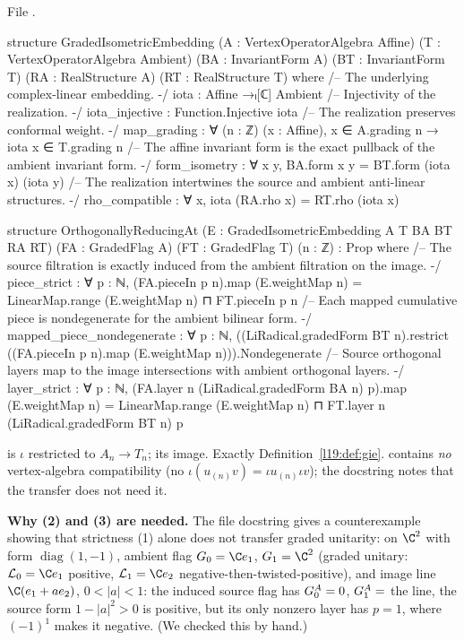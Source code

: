 \noindent File .
\begin{leancode}
structure GradedIsometricEmbedding
    (A : VertexOperatorAlgebra Affine) (T : VertexOperatorAlgebra Ambient)
    (BA : InvariantForm A) (BT : InvariantForm T)
    (RA : RealStructure A) (RT : RealStructure T) where
  /-- The underlying complex-linear embedding. -/
  iota : Affine →ₗ[ℂ] Ambient
  /-- Injectivity of the realization. -/
  iota_injective : Function.Injective iota
  /-- The realization preserves conformal weight. -/
  map_grading : ∀ (n : ℤ) (x : Affine), x ∈ A.grading n → iota x ∈ T.grading n
  /-- The affine invariant form is the exact pullback of the ambient invariant form. -/
  form_isometry : ∀ x y, BA.form x y = BT.form (iota x) (iota y)
  /-- The realization intertwines the source and ambient anti-linear structures. -/
  rho_compatible : ∀ x, iota (RA.rho x) = RT.rho (iota x)

structure OrthogonallyReducingAt
    (E : GradedIsometricEmbedding A T BA BT RA RT)
    (FA : GradedFlag A) (FT : GradedFlag T) (n : ℤ) : Prop where
  /-- The source filtration is exactly induced from the ambient filtration on the image. -/
  piece_strict : ∀ p : ℕ,
    (FA.pieceIn p n).map (E.weightMap n) =
      LinearMap.range (E.weightMap n) ⊓ FT.pieceIn p n
  /-- Each mapped cumulative piece is nondegenerate for the ambient bilinear form. -/
  mapped_piece_nondegenerate : ∀ p : ℕ,
    ((LiRadical.gradedForm BT n).restrict
      ((FA.pieceIn p n).map (E.weightMap n))).Nondegenerate
  /-- Source orthogonal layers map to the image intersections with ambient orthogonal layers. -/
  layer_strict : ∀ p : ℕ,
    (FA.layer n (LiRadical.gradedForm BA n) p).map (E.weightMap n) =
      LinearMap.range (E.weightMap n) ⊓
        FT.layer n (LiRadical.gradedForm BT n) p
\end{leancode}

\begin{dictionary}
 is $\iota$ restricted to $A_n\to T_n$;  its image. Exactly
Definition~\ref{l19:def:gie}.  contains \emph{no} vertex-algebra compatibility
(no $\iota(u_{(n)}v) = \iota u_{(n)}\iota v$); the docstring notes that the transfer does not need it.

\textbf{Why (2) and (3) are needed.} The file docstring gives a counterexample showing that strictness (1)
alone does not transfer graded unitarity: on $\C^2$ with form $\operatorname{diag}(1,-1)$, ambient flag
$\lnineteenG_0 = \C e_1$, $\lnineteenG_1 = \C^2$ (graded unitary: $\lnineteenLay_0 = \C e_1$ positive, $\lnineteenLay_1 = \C e_2$
negative-then-twisted-positive), and image line $\C(e_1+ae_2)$, $0<|a|<1$: the induced source flag has
$G^A_0 = 0$, $G^A_1 = $ the line, the source form $1-|a|^2>0$ is positive, but its only nonzero layer
has $p = 1$, where $(-1)^1$ makes it negative. (We checked this by hand.)
\end{dictionary}

